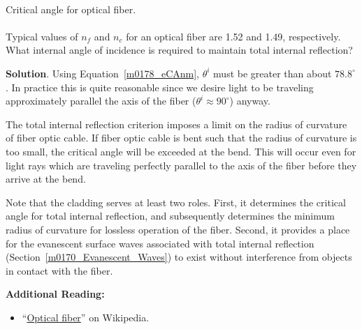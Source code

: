 ~\\ \begin{example} 
\begin{mdframed}[backgroundcolor=brown!20,linecolor=brown!20]\raggedright
Critical angle for optical fiber.
\\~\\
Typical values of $n_f$ and $n_c$ for an optical fiber are 1.52 and 1.49, respectively.  What internal angle of incidence is required to maintain total internal reflection?

{\bf Solution}. Using Equation~\ref{m0178_eCAnm}, $\theta^i$ must be greater than about $78.8^{\circ}$.  
In practice this is quite reasonable since we desire light to be traveling approximately parallel the axis of the fiber ($\theta^i\approx 90^{\circ}$) anyway.
\end{mdframed}
\end{example}

The total internal reflection criterion imposes a limit on the radius of curvature of fiber optic cable.
If fiber optic cable is bent such that the radius of curvature is too small, the critical angle will be exceeded at the bend.
This will occur even for light rays which are traveling perfectly parallel to the axis of the fiber before they arrive at the bend.

Note that the cladding serves at least two roles.  
First, it determines the critical angle for total internal reflection, and subsequently determines the minimum radius of curvature for lossless operation of the fiber.
Second, it provides a place for the evanescent surface waves associated with total internal reflection (Section~\ref{m0170_Evanescent_Waves}) to exist without interference from objects in contact with the fiber.


{\bf Additional Reading:}
\begin{itemize}
\item ``\href{https://en.wikipedia.org/wiki/Optical_fiber}{Optical fiber}'' on Wikipedia.
\end{itemize}



